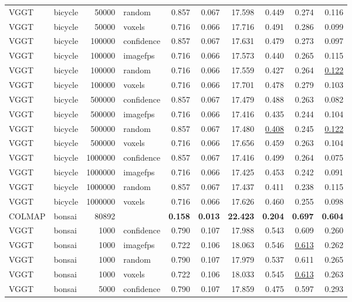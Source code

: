 \begin{table}[H]
\begin{tabular}{llrlrrrrrr}
VGGT & bicycle & 50000 & random & 0.857 & 0.067 & 17.598 & 0.449 & 0.274 & 0.116 \\
VGGT & bicycle & 50000 & voxels & 0.716 & 0.066 & 17.716 & 0.491 & 0.286 & 0.099 \\
VGGT & bicycle & 100000 & confidence & 0.857 & 0.067 & 17.631 & 0.479 & 0.273 & 0.097 \\
VGGT & bicycle & 100000 & imagefps & 0.716 & 0.066 & 17.573 & 0.440 & 0.265 & 0.115 \\
VGGT & bicycle & 100000 & random & 0.716 & 0.066 & 17.559 & 0.427 & 0.264 & \underline{0.122} \\
VGGT & bicycle & 100000 & voxels & 0.716 & 0.066 & 17.701 & 0.478 & 0.279 & 0.103 \\
VGGT & bicycle & 500000 & confidence & 0.857 & 0.067 & 17.479 & 0.488 & 0.263 & 0.082 \\
VGGT & bicycle & 500000 & imagefps & 0.716 & 0.066 & 17.416 & 0.435 & 0.244 & 0.104 \\
VGGT & bicycle & 500000 & random & 0.857 & 0.067 & 17.480 & \underline{0.408} & 0.245 & \underline{0.122} \\
VGGT & bicycle & 500000 & voxels & 0.716 & 0.066 & 17.656 & 0.459 & 0.263 & 0.104 \\
VGGT & bicycle & 1000000 & confidence & 0.857 & 0.067 & 17.416 & 0.499 & 0.264 & 0.075 \\
VGGT & bicycle & 1000000 & imagefps & 0.716 & 0.066 & 17.425 & 0.453 & 0.242 & 0.091 \\
VGGT & bicycle & 1000000 & random & 0.857 & 0.067 & 17.437 & 0.411 & 0.238 & 0.115 \\
VGGT & bicycle & 1000000 & voxels & 0.716 & 0.066 & 17.626 & 0.460 & 0.255 & 0.098 \\
\midrule
COLMAP & bonsai & 80892 &  & \textbf{0.158} & \textbf{0.013} & \textbf{22.423} & \textbf{0.204} & \textbf{0.697} & \textbf{0.604} \\
VGGT & bonsai & 1000 & confidence & 0.790 & 0.107 & 17.988 & 0.543 & 0.609 & 0.260 \\
VGGT & bonsai & 1000 & imagefps & 0.722 & 0.106 & 18.063 & 0.546 & \underline{0.613} & 0.262 \\
VGGT & bonsai & 1000 & random & 0.790 & 0.107 & 17.979 & 0.537 & 0.611 & 0.265 \\
VGGT & bonsai & 1000 & voxels & 0.722 & 0.106 & 18.033 & 0.545 & \underline{0.613} & 0.263 \\
VGGT & bonsai & 5000 & confidence & 0.790 & 0.107 & 17.859 & 0.475 & 0.597 & 0.293 \\

\end{tabular}
\end{table}
